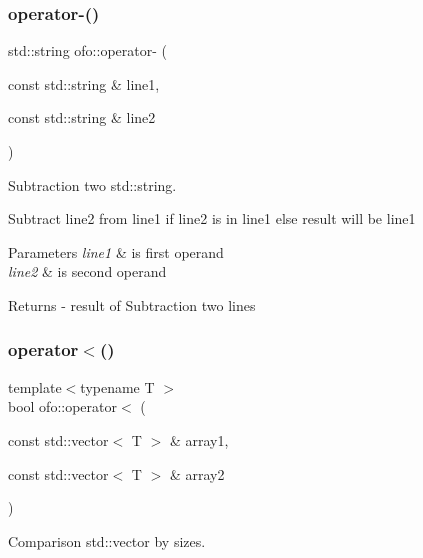 \subsubsection{\texorpdfstring{operator-\/()}{operator-()}\hspace{0.1cm}{\footnotesize\ttfamily [2/2]}}
{\footnotesize\ttfamily std\+::string ofo\+::operator-\/ (\begin{DoxyParamCaption}\item[{const std\+::string \&}]{line1,  }\item[{const std\+::string \&}]{line2 }\end{DoxyParamCaption})}



Subtraction two std\+::string. 

Subtract \textquotesingle{}line2\textquotesingle{} from \textquotesingle{}line1\textquotesingle{} if \textquotesingle{}line2\textquotesingle{} is in \textquotesingle{}line1\textquotesingle{} else result will be \textquotesingle{}line1\textquotesingle{} 
\begin{DoxyParams}{Parameters}
{\em line1} & is first operand \\
\hline
{\em line2} & is second operand \\
\hline
\end{DoxyParams}
\begin{DoxyReturn}{Returns}
-\/ result of Subtraction two lines 
\end{DoxyReturn}
\mbox{\label{namespaceofo_a3a9f0e591617562dc29964c77510abf1}} 
\subsubsection{\texorpdfstring{operator$<$()}{operator<()}}
{\footnotesize\ttfamily template$<$typename T $>$ \\
bool ofo\+::operator$<$ (\begin{DoxyParamCaption}\item[{const std\+::vector$<$ T $>$ \&}]{array1,  }\item[{const std\+::vector$<$ T $>$ \&}]{array2 }\end{DoxyParamCaption})}



Comparison std\+::vector by sizes. 

